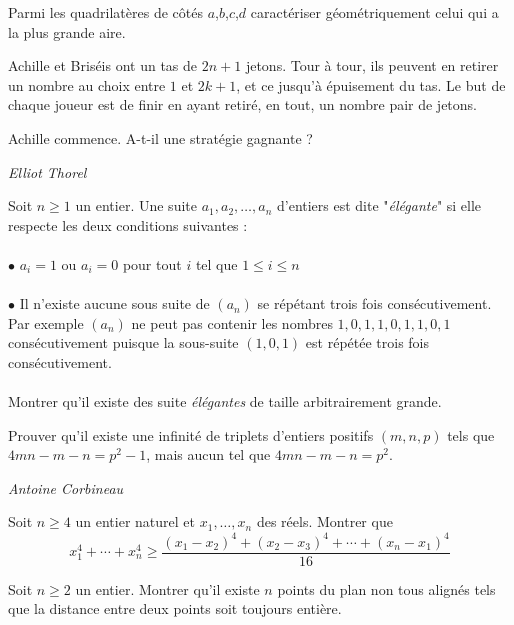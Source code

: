 \begin{exo}{}
Parmi les quadrilatères de côtés
$a$,$b$,$c$,$d$ caractériser géométriquement celui qui a la plus
grande aire.
\end{exo}

\begin{exo}{ }
Achille et Briséis ont un tas de $2n+1$ jetons. Tour à tour, ils peuvent en retirer un nombre au choix entre $1$ et $2k+1$, et ce jusqu'à épuisement du tas. Le but de chaque joueur est de finir en ayant retiré, en tout,
un nombre pair de jetons.

Achille commence. A-t-il une stratégie gagnante ?

\medskip
\textit{Elliot Thorel}
\end{exo}

\begin{exo}{}
Soit $n\ge 1$ un entier. Une suite $a_1,a_2,\dots,a_n$ d'entiers est dite "\textit{élégante}" si elle respecte les deux conditions suivantes :\\~~\\
$\bullet$ $a_i=1$ ou $a_i=0$ pour tout $i$ tel que $1\le i\le n$\\~~\\
$\bullet$ Il n'existe aucune sous suite de $(a_n)$ se répétant trois fois consécutivement. Par exemple $(a_n)$ ne peut pas contenir les nombres $1,0,1,1,0,1,1,0,1$ consécutivement puisque la sous-suite $(1,0,1)$ est répétée trois fois consécutivement. \\~~\\
Montrer qu'il existe des suite \textit{élégantes} de taille arbitrairement grande.

\end{exo}

\begin{exo}{}
Prouver qu'il existe une infinité de triplets d'entiers positifs $(m,n,p)$ tels que $4mn-m-n=p^2-1$, mais aucun tel que $4mn-m-n=p^2$.

\medskip
\textit{Antoine Corbineau}
\end{exo}

\begin{exo}{}
Soit $n \geq 4$ un entier naturel et $x_1, \dots, x_n$ des réels. Montrer que
$$x_1^4+\cdots+x_n^4 \geq \dfrac{(x_1-x_2)^4+(x_2-x_3)^4+ \cdots +(x_n-x_1)^4}{16}$$\end{exo}


\begin{exo}{}
Soit $n\ge 2$ un entier. Montrer qu'il existe $n$ points du plan non tous alignés tels que la distance entre deux points soit toujours entière.
\end{exo}


